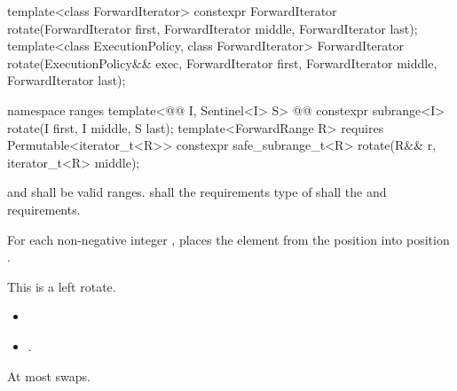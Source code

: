 %
\begin{itemdecl}
template<class ForwardIterator>
  constexpr ForwardIterator
    rotate(ForwardIterator first, ForwardIterator middle, ForwardIterator last);
template<class ExecutionPolicy, class ForwardIterator>
  ForwardIterator
    rotate(ExecutionPolicy&& exec,
           ForwardIterator first, ForwardIterator middle, ForwardIterator last);
\end{itemdecl}
\begin{addedblock}
\begin{itemdecl}
namespace ranges {
  template<@@ I, Sentinel<I> S>
    @@
    constexpr subrange<I> rotate(I first, I middle, S last);
  template<ForwardRange R>
    requires Permutable<iterator_t<R>>
    constexpr safe_subrange_t<R> rotate(R&& r, iterator_t<R> middle);
}
\end{itemdecl}
\end{addedblock}

\begin{itemdescr}
\pnum
\requires
{}
and
shall be valid ranges.
 shall  the
requirements
type of  shall 
the  and
 requirements.

\pnum
\effects
For each non-negative integer
,
places the element from the position
into position
.
\begin{addedblock}
\begin{note}
This is a left rotate.
\end{note}
\end{addedblock}

\pnum
\returns
\begin{itemize}
\item {} 
\item {}.
\end{itemize}

\pnum
{}

\pnum
\complexity
At most
swaps.
\end{itemdescr}


